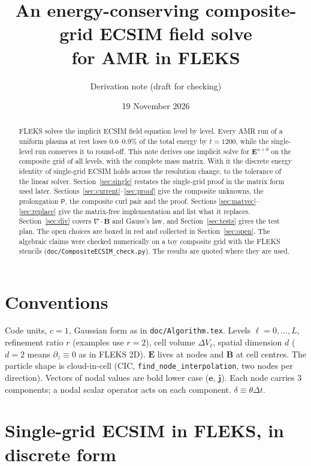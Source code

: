 \documentclass[a4paper,11pt]{article}
\title{An energy-conserving composite-grid ECSIM field solve\\ for AMR in FLEKS}
\author{Derivation note (draft for checking)}
\date{19 November 2026}
\newcommand{\code}[1]{\texttt{#1}}
\newcommand{\EE}{\mathbf{e}}
\newcommand{\jj}{\mathbf{j}}
\newcommand{\Pm}{\mathsf{P}}
\begin{document}
\maketitle

\begin{abstract}
FLEKS solves the implicit ECSIM field equation level by level. Every AMR run of
a uniform plasma at rest loses 0.6--0.9\% of the total energy by $t=1200$, while
the single-level run conserves it to round-off. This note derives one implicit
solve for $\mathbf{E}^{n+\theta}$ on the composite grid of all levels, with the
complete mass matrix. With it the discrete energy identity of single-grid ECSIM
holds across the resolution change, to the tolerance of the linear solver.
Section~\ref{sec:single} restates the single-grid proof in the matrix form used
later. Sections~\ref{sec:current}--\ref{sec:proof} give the composite unknowns,
the prolongation $\Pm$, the composite curl pair and the proof. Sections
\ref{sec:matvec}--\ref{sec:replace} give the matrix-free implementation and list
what it replaces. Section~\ref{sec:div} covers $\nabla\cdot\mathbf{B}$ and Gauss's
law, and Section~\ref{sec:tests} gives the test plan. The open choices are boxed
in red and collected in Section~\ref{sec:open}. The algebraic claims were checked
numerically on a toy composite grid with the FLEKS stencils
(\code{doc/CompositeECSIM\_check.py}). The results are quoted where they are used.
\end{abstract}

\section*{Conventions}
Code units, $c=1$, Gaussian form as in \code{doc/Algorithm.tex}. Levels
$\ell=0,\dots,L$, refinement ratio $r$ (examples use $r=2$), cell volume
$\Delta V_\ell$, spatial dimension $d$ ($d=2$ means $\partial_z\equiv0$ as in
FLEKS 2D). $\mathbf{E}$ lives at nodes and $\mathbf{B}$ at cell centres. The
particle shape is cloud-in-cell (CIC, \code{find\_node\_interpolation}, two nodes
per direction). Vectors of nodal values are bold lower case ($\EE$, $\jj$). Each
node carries 3 components; a nodal scalar operator acts on each component.
$\delta \equiv \theta\Delta t$.

\section{Single-grid ECSIM in FLEKS, in discrete form}\label{sec:single}
\end{document}
